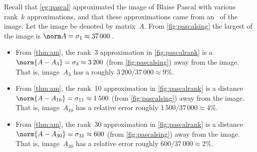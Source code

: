 \begin{example} 
Recall that \cref{eg:pascal} approximated the image of Blaise Pascal with various rank~\(k\) approximations, and that
these approximations came from an \svd\ of the image.
Let the image be denoted by matrix~\(A\).
From \cref{fig:pascalsing} the largest  of the image is \(\norm A=\sigma_1\approx37\,000\)\,.
\begin{itemize}
\item From  \cref{thm:am}, the rank~3 approximation in \cref{fig:pascalrank} is a  \(\norm{A-A_3}=\sigma_4\approx 3\,200\) (from \cref{fig:pascalsing}) away from the image.  
That is, image~\(A_3\) has a  roughly \(3\,200/37\,000\approx 9\%\).
\item From  \cref{thm:am}, the rank~10 approximation in \cref{fig:pascalrank} is a distance \(\norm{A-A_{10}}=\sigma_{11}\approx 1\,500\) (from \cref{fig:pascalsing}) away from the image.  
That is, image~\(A_{10}\) has a relative error roughly \(1\,500/37\,000 \approx 4\%\). 
\item From  \cref{thm:am}, the rank~30 approximation in \cref{fig:pascalrank} is a distance \(\norm{A-A_{30}}=\sigma_{31}\approx 600\) (from \cref{fig:pascalsing}) away from the image.  
That is, image~\(A_{30}\) has a relative error roughly \(600/37\,000 \approx 2\%\). 
\end{itemize}
\end{example}


